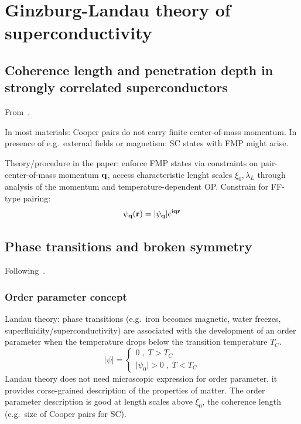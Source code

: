 \documentclass[../main.tex]{subfiles}
\begin{document}
\chapter{Ginzburg-Landau theory of superconductivity}

\section{Coherence length and penetration depth in strongly correlated superconductors}

From~\cite{wittBypassingLatticeBCSBEC2024}.

In most materials: Cooper pairs do not carry finite center-of-mass momentum.
In presence of e.g.\ external fields or magnetism: SC states with FMP might arise.

Theory/procedure in the paper: enforce FMP states via constraints on pair-center-of-mass momentum \(\bm{\mathrm{q}}\), access characteristic lenght scales \(\xi_0, \lambda_L\) through analysis of the momentum and temperature-dependent OP\@.
Constrain for FF-type pairing:
\begin{equation}
    \psi_{\bm{\mathrm{q}}} (\bm{\mathrm{r}}) = \vert \psi_{\bm{\mathrm{q}}} \vert e^{\mathrm{i} \bm{\mathrm{q}} \bm{\mathrm{r}}}
\end{equation}


\section{Phase transitions and broken symmetry}

Following~\cite[ch. 11]{colemanIntroductionManyBodyPhysics2015}.

\subsection{Order parameter concept}

Landau theory: phase transitions (e.g.\ iron becomes magnetic, water freezes, superfluidity/superconductivity) are associated with the development of an order parameter when the temperature drops below the transition temperature \(T_C\).
\begin{equation}
    \vert \psi \vert =
    \begin{cases}
        0\;,\; T > T_C \\
        \vert \psi_0 \vert > 0 \;,\; T < T_C
    \end{cases}
\end{equation}
Landau theory does not need microscopic expression for order parameter, it provides corse-grained description of the properties of matter.
The order parameter description is good at length scales above \(\xi_0\), the coherence length (e.g.\ size of Cooper pairs for SC).
\end{document}
